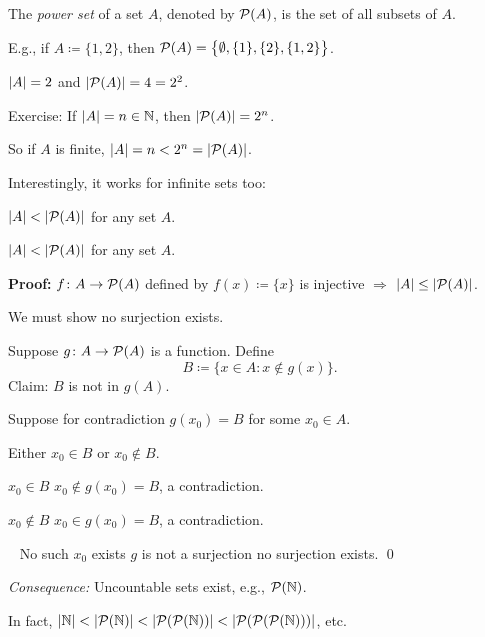 \documentclass[10pt,aspectratio=149]{beamer}
\begin{document}
\begin{frame}

\begin{definition}
The \emph{power set} of a set $A$, denoted by ${\mathcal{P}}(A)$,
is the set of all subsets of $A$.
\end{definition}

\pause

E.g., if $A \coloneqq \{ 1,2\}$, then ${\mathcal{P}}(A) = \bigl\{ \emptyset, \{ 1 \}, \{ 2 \}, \{ 1, 2 \} \bigr\}$.

\pause
$\left\lvert {A} \right\rvert = 2$ and $\left\lvert {{\mathcal{P}}(A)} \right\rvert = 4 = 2^2$.

\medskip
\pause

Exercise: If $\left\lvert {A} \right\rvert = n \in {\mathbb{N}}$, then $\left\lvert {{\mathcal{P}}(A)} \right\rvert = 2^n$.

\medskip
\pause

So if $A$ is finite, $\left\lvert {A} \right\rvert = n < 2^n = \left\lvert {{\mathcal{P}}(A)} \right\rvert$.

\medskip
\pause

Interestingly, it works for infinite sets too:

\begin{theorem}[Cantor]
$\left\lvert {A} \right\rvert < \left\lvert {{\mathcal{P}}(A)} \right\rvert$ for any set $A$.
\end{theorem}

%

\end{frame}

\begin{frame}

\begin{theorem}[Cantor]
$\left\lvert {A} \right\rvert < \left\lvert {{\mathcal{P}}(A)} \right\rvert$ for any set $A$.
\end{theorem}

\pause

\textbf{Proof:}
$f \colon A \to {\mathcal{P}}(A)$ defined by
$f(x) \coloneqq \{ x \}$ is injective \pause $\Rightarrow$
$\left\lvert {A} \right\rvert \leq \left\lvert {{\mathcal{P}}(A)} \right\rvert$.

\medskip
\pause

We must show no surjection exists.

\pause

Suppose $g \colon A \to {\mathcal{P}}(A)$ is a function.
Define
\[
B \coloneqq \bigl\{ x \in A : x \notin g(x) \bigr\} .
\]
\pause
Claim: $B$ is not in $g(A)$.

\pause
Suppose for contradiction $g(x_0) = B$ for some $x_0 \in A$.

\pause
Either $x_0 \in B$ or $x_0 \notin B$.

\pause
$x_0 \in B$ \wthus $x_0 \notin g(x_0) = B$, \quad a contradiction.

\pause
$x_0 \notin B$ \wthus $x_0 \in g(x_0) = B$, \quad a contradiction.

\pause
\thus ~
No such $x_0$ exists
\pause
\wthus $g$ is not a surjection
\pause
\wthus no surjection exists.
\qed

\medskip
\pause

\emph{Consequence:} Uncountable sets exist, e.g., ${\mathcal{P}}({\mathbb{N}})$.

\medskip
\pause

In fact,
$\left\lvert {{\mathbb{N}}} \right\rvert < \left\lvert {{\mathcal{P}}({\mathbb{N}})} \right\rvert < \left\lvert {{\mathcal{P}}({\mathcal{P}}({\mathbb{N}}))} \right\rvert < \left\lvert {{\mathcal{P}}({\mathcal{P}}({\mathcal{P}}({\mathbb{N}})))} \right\rvert$, etc.

\end{frame}
\end{document}
